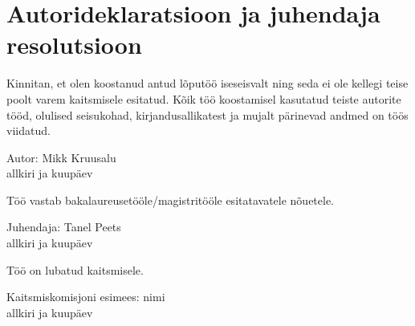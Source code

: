 \chapter*{Autorideklaratsioon ja juhendaja resolutsioon}
\thispagestyle{empty}

Kinnitan, et olen koostanud antud lõputöö iseseisvalt ning seda ei ole kellegi teise poolt varem kaitsmisele esitatud. Kõik töö koostamisel kasutatud teiste autorite tööd, olulised seisukohad, kirjandusallikatest ja mujalt pärinevad andmed on töös viidatud.

Autor: Mikk Kruusalu \\
allkiri ja kuupäev

\vspace{2cm}

Töö vastab bakalaureusetööle/magistritööle esitatavatele nõuetele.

Juhendaja: Tanel Peets \\
allkiri ja kuupäev

\vspace{5cm}

Töö on lubatud kaitsmisele.

Kaitsmiskomisjoni esimees: nimi \\
allkiri ja kuupäev


